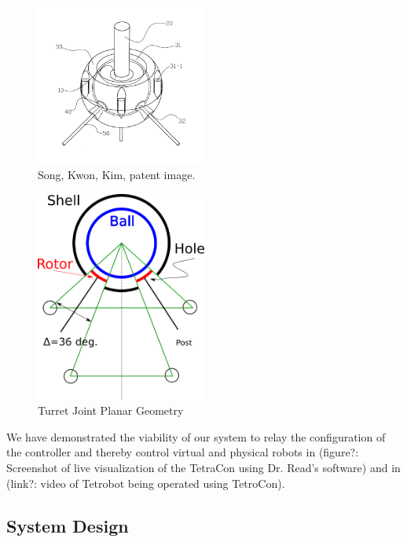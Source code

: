 \documentclass[11pt]{article}
\begin{document}
\begin{figure}[H]
  \centering
    \includegraphics[width=0.5\textwidth]{figures/SongKwonKimImage.png}
    \caption[Song, Kwon, Kim, patent image.]{Song, Kwon, Kim, patent image.}
      \label{SongKwonKimImage}
\end{figure}


\begin{figure}[H]
  \centering
  \includegraphics[width=0.5\textwidth]{figures/SimplifiedConstraintDrawing.png}
    \caption[Turret Joint Planar Geometry]{Turret Joint Planar Geometry}
      \label{simplified-constraint-drawing}
\end{figure}

  We have demonstrated the viability of our system to relay the configuration of the controller and thereby control virtual and physical robots  in (figure?: Screenshot of live visualization of the TetraCon using Dr. Read's software) and in (link?: video of Tetrobot being operated using TetroCon).

\subsection{System Design}
\end{document}
